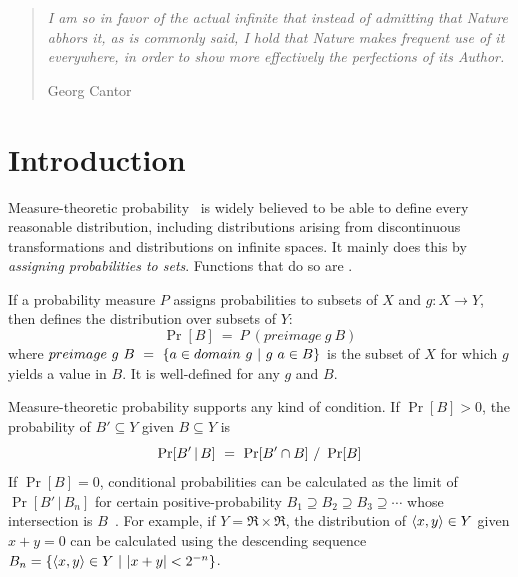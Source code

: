 \newsavebox{\codebox}

\begin{quote}
\textit{I am so in favor of the actual infinite that instead of admitting that Nature abhors it, as is commonly said, I hold that Nature makes frequent use of it everywhere, in order to show more effectively the perfections of its Author.}

\hfill Georg Cantor
\end{quote}


\section{Introduction}

Measure-theoretic probability~\cite{cit:klenke-2006-probability} is widely believed to be able to define every reasonable distribution, including distributions arising from discontinuous transformations and distributions on infinite spaces.
It mainly does this by \emph{assigning probabilities to sets}.
Functions that do so are .

If a probability measure $P$ assigns probabilities to subsets of $X$ and $g : X \to Y$, then  defines the distribution over subsets of $Y$:
\begin{equation}
	\Pr[B] \ = \ P~(preimage~g~B)
\end{equation}
where $preimage~g~B\ =\ \lbrace {a \in domain~g} \ \lvert\ {g~a \in B} \rbrace$ is the subset of $X$ for which $g$ yields a value in $B$.
It is well-defined for any $g$ and $B$.

Measure-theoretic probability supports any kind of condition.
If $\Pr[B] > \mathrm{0}$, the probability of $B' \subseteq Y$ given $B \subseteq Y$ is
\begin{equation}
	\Pr[B'\,|\,B]\ =\ \Pr[B' \cap B]~{/}~\Pr[B]
\label{eqn:bayes-law-preimage}
\end{equation}
If $\Pr[B] = \mathrm{0}$, conditional probabilities can be calculated as the limit of $\Pr[B'\,|\,B_n]$ for certain positive-probability $B_1 \supseteq B_2 \supseteq B_3 \supseteq \cdots$ whose intersection is $B$~\cite{cit:samuels-1978amm-radnik}.
For example, if $Y = \Re \times \Re$, the distribution of $\langle{x,y}\rangle \in Y$ given $x + y = \mathrm{0}$ can be calculated using the descending sequence $B_n = \lbrace {\langle{x,y}\rangle \in Y} \ \lvert\ {|x + y| < \mathrm{2}^{-n}} \rbrace$.

